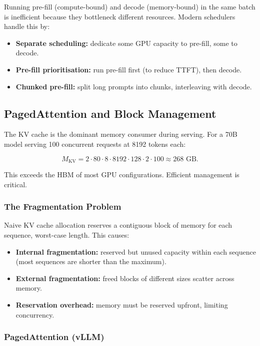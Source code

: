\documentclass[11pt,a4paper]{article}
\theoremstyle{definition}
\begin{document}
Running pre-fill (compute-bound) and decode (memory-bound) in the same batch is inefficient because they bottleneck different resources. Modern schedulers handle this by:

\begin{itemize}
	\item \textbf{Separate scheduling:} dedicate some GPU capacity to pre-fill, some to decode.
	\item \textbf{Pre-fill prioritisation:} run pre-fill first (to reduce TTFT), then decode.
	\item \textbf{Chunked pre-fill:} split long prompts into chunks, interleaving with decode.
\end{itemize}

\subsection{PagedAttention and Block Management}

The KV cache is the dominant memory consumer during serving. For a 70B model serving 100 concurrent requests at 8192 tokens each:

\begin{equation}
	M_{\text{KV}} = 2 \cdot 80 \cdot 8 \cdot 8192 \cdot 128 \cdot 2 \cdot 100 \approx 268 \text{ GB}.
\end{equation}

This exceeds the HBM of most GPU configurations. Efficient management is critical.

\subsubsection{The Fragmentation Problem}

Naive KV cache allocation reserves a contiguous block of memory for each sequence, worst-case length. This causes:

\begin{itemize}
	\item \textbf{Internal fragmentation:} reserved but unused capacity within each sequence (most sequences are shorter than the maximum).
	\item \textbf{External fragmentation:} freed blocks of different sizes scatter across memory.
	\item \textbf{Reservation overhead:} memory must be reserved upfront, limiting concurrency.
\end{itemize}

\subsubsection{PagedAttention (vLLM)}
\end{document}
